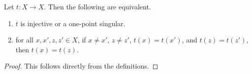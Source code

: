\begin{proposition} \label{prop:char-one-attractor0}
 Let $t \colon X \to X$. Then the following are equivalent.	
\begin{enumerate}
\item \label{prop:char-one-attractor0:1} $t$ is injective or a one-point singular.

\item \label{prop:char-one-attractor0:2} for all $x,x',z,z' \in X$,
 if $x \ne x'$, $z \ne z'$, $t(x) = t(x')$, and $t(z) = t(z')$, then $t(x) = t(z)$.
\end{enumerate}
\end{proposition}
\begin{proof}
This follows directly from the definitions.
\end{proof}

